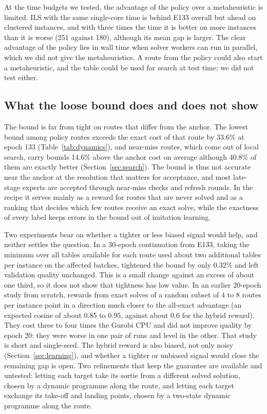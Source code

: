 \documentclass[preprint,12pt,authoryear]{elsarticle}
\begin{document}
At the time budgets we tested, the advantage of the policy over a metaheuristic is limited. ILS with the same single-core time is behind E133 overall but ahead on clustered instances, and with three times the time it is better on more instances than it is worse (251 against 180), although its mean gap is larger. The clear advantage of the policy lies in wall time when solver workers can run in parallel, which we did not give the metaheuristics. A route from the policy could also start a metaheuristic, and the table could be used for search at test time; we did not test either.

\subsection{What the loose bound does and does not show}
\label{sec:loose}

The bound is far from tight on routes that differ from the anchor. The lowest bound among policy routes exceeds the exact cost of that route by 33.6\% at epoch 133 (Table~\ref{tab:dynamics}), and near-miss routes, which come out of local search, carry bounds 14.6\% above the anchor cost on average although 40.8\% of them are exactly better (Section~\ref{sec:search}). The bound is thus not accurate near the anchor at the resolution that matters for acceptance, and most late-stage experts are accepted through near-miss checks and refresh rounds. In the recipe it serves mainly as a reward for routes that are never solved and as a ranking that decides which few routes receive an exact solve, while the exactness of every label keeps errors in the bound out of imitation learning.

Two experiments bear on whether a tighter or less biased signal would help, and neither settles the question. In a 30-epoch continuation from E133, taking the minimum over all tables available for each route used about two additional tables per instance on the affected batches, tightened the bound by only 0.32\% and left validation quality unchanged. This is a small change against an excess of about one third, so it does not show that tightness has low value. In an earlier 20-epoch study from scratch, rewards from exact solves of a random subset of 4 to 8 routes per instance point in a direction much closer to the all-exact advantage (an expected cosine of about 0.85 to 0.95, against about 0.6 for the hybrid reward). They cost three to four times the Gurobi CPU and did not improve quality by epoch 20: they were worse in one pair of runs and level in the other. That study is short and single-seed. The hybrid reward is also biased, not only noisy (Section~\ref{sec:learning}), and whether a tighter or unbiased signal would close the remaining gap is open. Two refinements that keep the guarantee are available and untested: letting each target take its sortie from a different solved solution, chosen by a dynamic programme along the route, and letting each target exchange its take-off and landing points, chosen by a two-state dynamic programme along the route.
\end{document}
